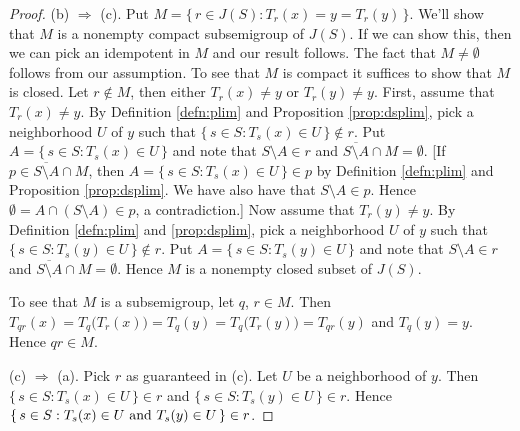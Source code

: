 \begin{proof}
    (b) $\Rightarrow$ (c).
    Put $M  = \{\, r \in J(S) : T_r(x) = y = T_r(y) \,\}$. 
    We'll show that $M$ is a nonempty compact subsemigroup of $J(S)$. 
    If we can show this, then we can pick an idempotent in $M$ and our
    result follows.
    The fact that $M \ne \emptyset$ follows from our assumption. 
    To see that $M$ is compact it suffices to show that $M$ is
    closed. 
    Let $r \not\in M$, then either $T_r(x) \ne y$ or $T_r(y) \ne y$. 
    First, assume that $T_r(x) \ne y$. 
    By Definition \ref{defn:plim} and Proposition \ref{prop:dsplim},
    pick a
    neighborhood $U$ of $y$ such that 
    $\{\, s \in S : T_s(x) \in U \,\} \not\in r$.
    Put $A = \{\, s \in S : T_s(x) \in U \,\}$ and note that $S
    \setminus A \in r$ and $\overline{S \setminus A} \cap M =
    \emptyset$.
    [If $p \in \overline{S \setminus A} \cap M$, then $A = \{\, s \in
    S : T_s(x) \in U \,\} \in p$ by Definition \ref{defn:plim} and
    Proposition \ref{prop:dsplim}.
    We have also have that $S \setminus A \in p$.
    Hence $\emptyset = A \cap (S \setminus A) \in p$, a
    contradiction.]
    Now assume that $T_r(y) \ne y$. 
    By Definition \ref{defn:plim} and \ref{prop:dsplim}, pick a
    neighborhood $U$ of $y$ such that
    $\{\, s \in S : T_s(y) \in U \,\} \not\in r$.
    Put $A = \{\, s \in S : T_s(y) \in U \,\}$ and note that $S
    \setminus A \in r$ and $\overline{S \setminus A} \cap M =
    \emptyset$.
    Hence $M$ is a nonempty closed subset of $J(S)$.

    To see that $M$ is a subsemigroup, let $q$, $r \in M$.
    Then $T_{qr}(x) = T_q\bigl(T_r(x)\bigr) = T_q(y) =
    T_q\bigl(T_r(y)\bigr) = T_{qr}(y)$ and $T_q(y) = y$. 
    Hence $qr \in M$. 
    
    (c) $\Rightarrow$ (a).
    Pick $r$ as guaranteed in (c). 
    Let $U$ be a neighborhood of $y$. 
    Then $\{\, s \in S : T_s(x) \in U \,\} \in r$ and $\{\,  s \in S :
    T_s(y) \in U \,\} \in r$.
    Hence $\{\, s \in S : \hbox{$T_s(x) \in U$ and $T_s(y) \in U$}
    \,\} \in r$.  
  \end{proof}

